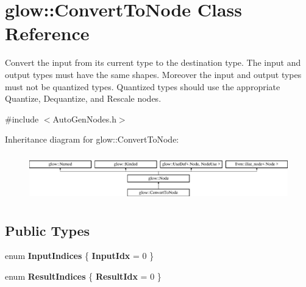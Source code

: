 \hypertarget{classglow_1_1_convert_to_node}{}\section{glow\+:\+:Convert\+To\+Node Class Reference}
\label{classglow_1_1_convert_to_node}


Convert the input from its current type to the destination type. The input and output types must have the same shapes. Moreover the input and output types must not be quantized types. Quantized types should use the appropriate Quantize, Dequantize, and Rescale nodes.  




{\ttfamily \#include $<$Auto\+Gen\+Nodes.\+h$>$}

Inheritance diagram for glow\+:\+:Convert\+To\+Node\+:\begin{figure}[H]
\begin{center}
\leavevmode
\includegraphics[height=2.028986cm]{classglow_1_1_convert_to_node}
\end{center}
\end{figure}
\subsection*{Public Types}
\begin{DoxyCompactItemize}
\item 
\mbox{\label{classglow_1_1_convert_to_node_ac19871f9fb9c86a03459c205607ebd6a}} 
enum {\bfseries Input\+Indices} \{ {\bfseries Input\+Idx} = 0
 \}
\item 
\mbox{\label{classglow_1_1_convert_to_node_aa41e37f602393ef2558d088bc90ac0bb}} 
enum {\bfseries Result\+Indices} \{ {\bfseries Result\+Idx} = 0
 \}
\end{DoxyCompactItemize}
